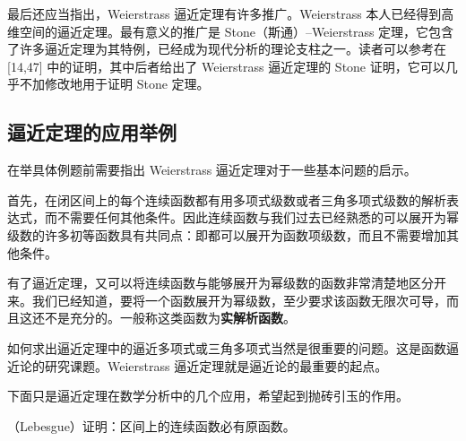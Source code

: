 最后还应当指出，Weierstrass 逼近定理有许多推广。Weierstrass 本人已经得到高维空间的逼近定理。最有意义的推广是 Stone（斯通）--Weierstrass 定理，它包含了许多逼近定理为其特例，已经成为现代分析的理论支柱之一。读者可以参考在 [14,47] 中的证明，其中后者给出了 Weierstrass 逼近定理的 Stone 证明，它可以几乎不加修改地用于证明 Stone 定理。

\subsection{逼近定理的应用举例}

在举具体例题前需要指出 Weierstrass 逼近定理对于一些基本问题的启示。

首先，在闭区间上的每个连续函数都有用多项式级数或者三角多项式级数的解析表达式，而不需要任何其他条件。因此连续函数与我们过去已经熟悉的可以展开为幂级数的许多初等函数具有共同点：即都可以展开为函数项级数，而且不需要增加其他条件。

有了逼近定理，又可以将连续函数与能够展开为幂级数的函数非常清楚地区分开来。我们已经知道，要将一个函数展开为幂级数，至少要求该函数无限次可导，而且这还不是充分的。一般称这类函数为\textbf{实解析函数}。

如何求出逼近定理中的逼近多项式或三角多项式当然是很重要的问题。这是函数逼近论的研究课题。Weierstrass 逼近定理就是逼近论的最重要的起点。

下面只是逼近定理在数学分析中的几个应用，希望起到抛砖引玉的作用。

\begin{xexample}[16.3.1]
（Lebesgue）证明：区间上的连续函数必有原函数。
\end{xexample}

